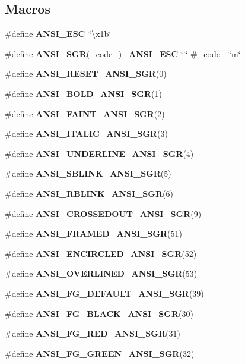 \subsection*{Macros}
\begin{DoxyCompactItemize}
\item 
\#define \textbf{ A\+N\+S\+I\+\_\+\+E\+SC}~\char`\"{}\textbackslash{}x1b\char`\"{}
\item 
\#define \textbf{ A\+N\+S\+I\+\_\+\+S\+GR}(\+\_\+code\+\_\+)~\textbf{ A\+N\+S\+I\+\_\+\+E\+SC} \char`\"{}[\char`\"{} \#\+\_\+code\+\_\+ \char`\"{}m\char`\"{}
\item 
\#define \textbf{ A\+N\+S\+I\+\_\+\+R\+E\+S\+ET}~\textbf{ A\+N\+S\+I\+\_\+\+S\+GR}(0)
\item 
\#define \textbf{ A\+N\+S\+I\+\_\+\+B\+O\+LD}~\textbf{ A\+N\+S\+I\+\_\+\+S\+GR}(1)
\item 
\#define \textbf{ A\+N\+S\+I\+\_\+\+F\+A\+I\+NT}~\textbf{ A\+N\+S\+I\+\_\+\+S\+GR}(2)
\item 
\#define \textbf{ A\+N\+S\+I\+\_\+\+I\+T\+A\+L\+IC}~\textbf{ A\+N\+S\+I\+\_\+\+S\+GR}(3)
\item 
\#define \textbf{ A\+N\+S\+I\+\_\+\+U\+N\+D\+E\+R\+L\+I\+NE}~\textbf{ A\+N\+S\+I\+\_\+\+S\+GR}(4)
\item 
\#define \textbf{ A\+N\+S\+I\+\_\+\+S\+B\+L\+I\+NK}~\textbf{ A\+N\+S\+I\+\_\+\+S\+GR}(5)
\item 
\#define \textbf{ A\+N\+S\+I\+\_\+\+R\+B\+L\+I\+NK}~\textbf{ A\+N\+S\+I\+\_\+\+S\+GR}(6)
\item 
\#define \textbf{ A\+N\+S\+I\+\_\+\+C\+R\+O\+S\+S\+E\+D\+O\+UT}~\textbf{ A\+N\+S\+I\+\_\+\+S\+GR}(9)
\item 
\#define \textbf{ A\+N\+S\+I\+\_\+\+F\+R\+A\+M\+ED}~\textbf{ A\+N\+S\+I\+\_\+\+S\+GR}(51)
\item 
\#define \textbf{ A\+N\+S\+I\+\_\+\+E\+N\+C\+I\+R\+C\+L\+ED}~\textbf{ A\+N\+S\+I\+\_\+\+S\+GR}(52)
\item 
\#define \textbf{ A\+N\+S\+I\+\_\+\+O\+V\+E\+R\+L\+I\+N\+ED}~\textbf{ A\+N\+S\+I\+\_\+\+S\+GR}(53)
\item 
\#define \textbf{ A\+N\+S\+I\+\_\+\+F\+G\+\_\+\+D\+E\+F\+A\+U\+LT}~\textbf{ A\+N\+S\+I\+\_\+\+S\+GR}(39)
\item 
\#define \textbf{ A\+N\+S\+I\+\_\+\+F\+G\+\_\+\+B\+L\+A\+CK}~\textbf{ A\+N\+S\+I\+\_\+\+S\+GR}(30)
\item 
\#define \textbf{ A\+N\+S\+I\+\_\+\+F\+G\+\_\+\+R\+ED}~\textbf{ A\+N\+S\+I\+\_\+\+S\+GR}(31)
\item 
\#define \textbf{ A\+N\+S\+I\+\_\+\+F\+G\+\_\+\+G\+R\+E\+EN}~\textbf{ A\+N\+S\+I\+\_\+\+S\+GR}(32)

\end{DoxyCompactItemize}
